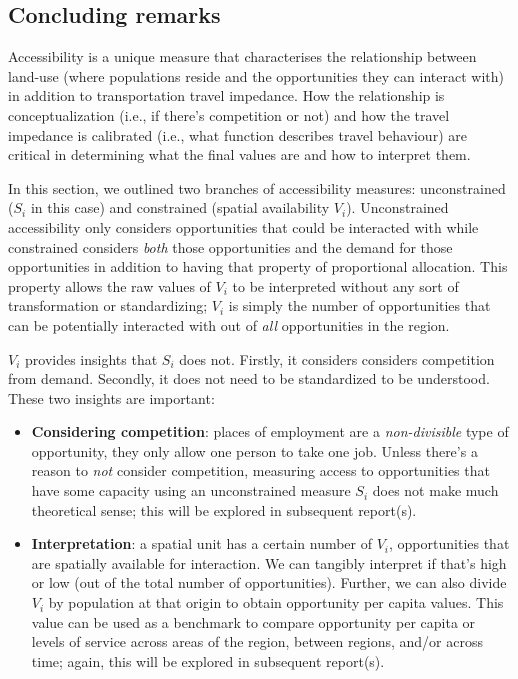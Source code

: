 \documentclass[12pt, oneside]{report}
\providecommand{\tightlist}{%
  \setlength{\itemsep}{0pt}\setlength{\parskip}{0pt}}\usepackage{longtable,booktabs,array}
\begin{document}
\hypertarget{concluding-remarks}{%
\subsection{Concluding remarks}\label{concluding-remarks}}

Accessibility is a unique measure that characterises the relationship
between land-use (where populations reside and the opportunities they
can interact with) in addition to transportation travel impedance. How
the relationship is conceptualization (i.e., if there's competition or
not) and how the travel impedance is calibrated (i.e., what function
describes travel behaviour) are critical in determining what the final
values are and how to interpret them.

In this section, we outlined two branches of accessibility measures:
unconstrained (\(S_i\) in this case) and constrained (spatial
availability \(V_i\)). Unconstrained accessibility only considers
opportunities that could be interacted with while constrained considers
\emph{both} those opportunities and the demand for those opportunities
in addition to having that property of proportional allocation. This
property allows the raw values of \(V_i\) to be interpreted without any
sort of transformation or standardizing; \(V_i\) is simply the number of
opportunities that can be potentially interacted with out of \emph{all}
opportunities in the region.

\(V_i\) provides insights that \(S_i\) does not. Firstly, it considers
considers competition from demand. Secondly, it does not need to be
standardized to be understood. These two insights are important:

\begin{itemize}
\tightlist
\item
  \textbf{Considering competition}: places of employment are a
  \emph{non-divisible} type of opportunity, they only allow one person
  to take one job. Unless there's a reason to \emph{not} consider
  competition, measuring access to opportunities that have some capacity
  using an unconstrained measure \(S_i\) does not make much theoretical
  sense; this will be explored in subsequent report(s).
\item
  \textbf{Interpretation}: a spatial unit has a certain number of
  \(V_i\), opportunities that are spatially available for interaction.
  We can tangibly interpret if that's high or low (out of the total
  number of opportunities). Further, we can also divide \(V_i\) by
  population at that origin to obtain opportunity per capita values.
  This value can be used as a benchmark to compare opportunity per
  capita or levels of service across areas of the region, between
  regions, and/or across time; again, this will be explored in
  subsequent report(s).
\end{itemize}
\end{document}
